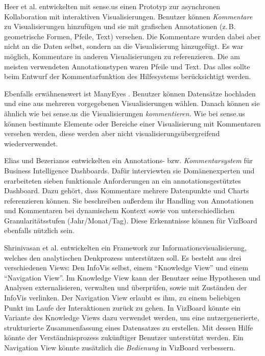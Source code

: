\documentclass[
	headsepline,
	footsepline,
	fontsize=12pt,
	bibliography=totoc
]{scrbook}
\begin{document}

Heer et al. \cite{Heer2007} entwickelten mit sense.us einen Prototyp zur asynchronen Kollaboration mit interaktiven Visualisierungen. Benutzer können \emph{Kommentare} zu Visualisierungen hinzufügen und sie mit grafischen Annotationen (z.\,B. geometrische Formen, Pfeile, Text) versehen. Die Kommentare wurden dabei aber nicht an die Daten selbst, sondern an die Visualisierung hinzugefügt. Es war möglich, Kommentare in anderen Visualisierungen zu referenzieren. Die am meisten verwendeten Annotationstypen waren Pfeile und Text. Das alles sollte beim Entwurf der Kommentarfunktion des Hilfesystems berücksichtigt werden.


Ebenfalls erwähnenswert ist ManyEyes \cite{Viegas2007}. Benutzer können Datensätze hochladen und eine aus mehreren vorgegebenen Visualisierungen wählen. Danach können sie ähnlich wie bei sense.us die Visualisierungen \emph{kommentieren}. Wie bei sense.us können bestimmte Elemente oder Bereiche einer Visualisierung mit Kommentaren versehen werden, diese werden aber nicht visualisierungsübergreifend wiederverwendet.


Elias und Bezerianos \cite{Elias2012} entwickelten ein Annotations- bzw. \emph{Kommentarsystem} für Business Intelligence Dashboards.
Dafür interviewten sie Domänenexperten und erarbeiteten sieben funktionale Anforderungen an ein annotationsgestütztes Dashboard. Dazu gehört, dass Kommentare mehrere Datenpunkte und Charts referenzieren können. Sie beschreiben außerdem ihr Handling von Annotationen und Kommentaren bei dynamischem Kontext sowie von unterschiedlichen Granularitätsstufen (Jahr/Monat/Tag). 
Diese Erkenntnisse können für VizBoard ebenfalls nützlich sein.


Shrinivasan et al. \cite{Shrinivasan2008} entwickelten ein Framework zur Informationsvisualisierung, welches den analytischen Denkprozess unterstützen soll.
Es besteht aus drei verschiedenen Views: Den InfoVis selbst, einem \enquote{Knowledge View} und einem \enquote{Navigation View}. Im Knowledge View kann der Benutzer seine Hypothesen und Analysen externalisieren, verwalten und überprüfen, sowie mit Zuständen der InfoVis verlinken. Der Navigation View erlaubt es ihm, zu einem beliebigen Punkt im Laufe der Interaktionen zurück zu gehen.
In VizBoard könnte ein Variante des Knowledge Views dazu verwendet werden, um eine nutzergenerierte, strukturierte Zusammenfassung eines Datensatzes zu erstellen. Mit dessen Hilfe könnte der Verständnisprozess zukünftiger Benutzer unterstützt werden. Ein Navigation View könnte zusätzlich die \emph{Bedienung} in VizBoard verbessern.
\end{document}
